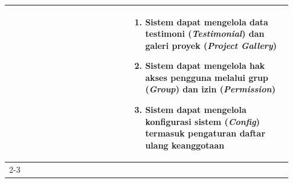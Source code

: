\begin{longtable}{|p{0.2\linewidth}|p{0.2\linewidth}|p{0.53\linewidth}|}
                                                                  &                                                                                                                                                         & \begin{enumerate}[leftmargin=*, nosep, resume*=FSCM] \item Sistem dapat mengelola data testimoni (\textit{Testimonial}) dan galeri proyek (\textit{Project Gallery}) \item Sistem dapat mengelola hak akses pengguna melalui grup (\textit{Group}) dan izin (\textit{Permission}) \item Sistem dapat mengelola konfigurasi sistem (\textit{Config}) termasuk pengaturan daftar ulang keanggotaan  \end{enumerate}                                                                                                                                                                                                                                                                                                                                                                                                                                                                                                                                                                                                                                                                                                                                                                                                                                                                                                                                                                                                                     \\
      \cline{2-3}


\end{longtable}
